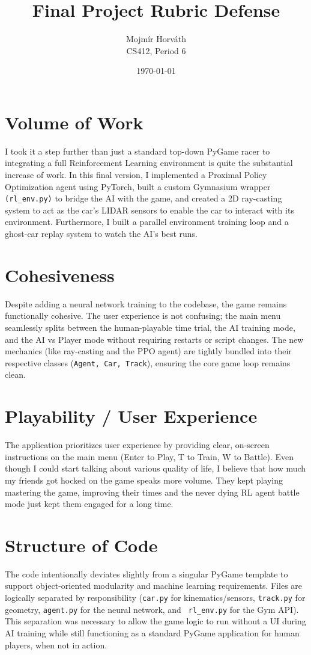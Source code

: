 \documentclass[11pt]{article}
\title{Final Project Rubric Defense}
\author{Mojmír Horváth \\ CS412, Period 6}
\date{\today}
\begin{document}
\maketitle

\section*{Volume of Work}
I took it a step further than just a standard top-down PyGame racer to integrating a full Reinforcement Learning environment is quite the substantial increase of work. In this final version, I implemented a Proximal Policy Optimization agent using PyTorch, built a custom Gymnasium wrapper \texttt{(rl\_env.py)} to bridge the AI with the game, and created a 2D ray-casting system to act as the car's LIDAR sensors to enable the car to interact with its environment. Furthermore, I built a parallel environment training loop and a ghost-car replay system to watch the AI's best runs.

\section*{Cohesiveness}
Despite adding a neural network training to the codebase, the game remains functionally cohesive. The user experience is not confusing; the main menu seamlessly splits between the human-playable time trial, the AI training mode, and the AI vs Player mode without requiring restarts or script changes. The new mechanics (like ray-casting and the PPO agent) are tightly bundled into their respective classes (\texttt{Agent, Car, Track}), ensuring the core game loop remains clean.

\section*{Playability / User Experience}
The application prioritizes user experience by providing clear, on-screen instructions on the main menu (Enter to Play, T to Train, W to Battle). Even though I could start talking about various quality of life, I believe that how much my friends got hocked on the game speaks more volume. They kept playing mastering the game, improving their times and the never dying RL agent battle mode just kept them engaged for a long time.

\section*{Structure of Code}
The code intentionally deviates slightly from a singular PyGame template to support object-oriented modularity and machine learning requirements. Files are logically separated by responsibility (\texttt{car.py} for kinematics/sensors, \texttt{track.py} for geometry, \texttt{agent.py} for the neural network, and \texttt{ rl\_env.py} for the Gym API). This separation was necessary to allow the game logic to run without a UI during AI training while still functioning as a standard PyGame application for human players, when not in action.
\end{document}
